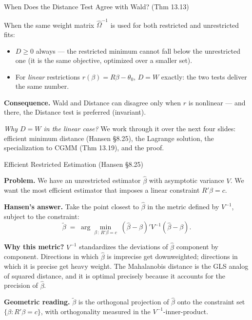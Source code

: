 \documentclass[aspectratio=169, handout]{beamer}
\numberwithin{equation}{section}
\begin{document}
\begin{frame}{When Does the Distance Test Agree with Wald? (Thm 13.13)}

When the same weight matrix $\hat\Omega^{-1}$ is used for both restricted and unrestricted fits:
\begin{itemize}\itemsep=2pt
\item $D \geq 0$ always --- the restricted minimum cannot fall below the unrestricted one (it is the same objective, optimized over a smaller set).
\item For \textit{linear} restrictions $r(\beta) = R\beta - \theta_0$, $D = W$ exactly: the two tests deliver the same number.
\end{itemize}

\medskip
\textbf{Consequence.} Wald and Distance can disagree only when $r$ is nonlinear --- and there, the Distance test is preferred (invariant).

\medskip
\textit{Why $D = W$ in the linear case?} We work through it over the next four slides: efficient minimum distance (Hansen \S8.25), the Lagrange solution, the specialization to CGMM (Thm 13.19), and the proof.

\end{frame}

\begin{frame}{Efficient Restricted Estimation (Hansen \S8.25)}

\textbf{Problem.} We have an unrestricted estimator $\hat\beta$ with asymptotic variance $V$. We want the most efficient estimator that imposes a linear constraint $R'\beta = c$.

\medskip
\textbf{Hansen's answer.} Take the point closest to $\hat\beta$ in the metric defined by $V^{-1}$, subject to the constraint:
$$\tilde\beta \;=\; \arg\min_{\beta\,:\,R'\beta = c}\;(\hat\beta - \beta)'V^{-1}(\hat\beta - \beta).$$

\medskip
\textbf{Why this metric?} $V^{-1}$ standardizes the deviations of $\hat\beta$ component by component. Directions in which $\hat\beta$ is imprecise get downweighted; directions in which it is precise get heavy weight. The Mahalanobis distance is the GLS analog of squared distance, and it is optimal precisely because it accounts for the precision of $\hat\beta$.

\medskip
\textbf{Geometric reading.} $\tilde\beta$ is the orthogonal projection of $\hat\beta$ onto the constraint set $\{\beta : R'\beta = c\}$, with orthogonality measured in the $V^{-1}$-inner-product.

\end{frame}
\end{document}
